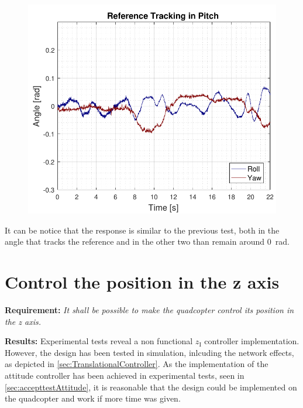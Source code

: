 \begin{minipage}{\linewidth}
\begin{minipage}{0.46\linewidth}
        \begin{figure}[H]
            \includegraphics[scale=.55]{figures/AccepttestRefTrackPitchRollYaw.pdf}
            \centering
            \label{fig:AccepttestRefTrackPitchRollYaw}
        \end{figure}
    \end{minipage}
\end{minipage}

It can be notice that the response is similar to the previous test, both in the angle that tracks the reference and in the other two than remain around \SI{0}{rad}.

\section{Control the position in the z axis}
\textbf{Requirement:}
\textit{It shall be possible to make the quadcopter control its position in the z axis.}

\textbf{Results:}
Experimental tests reveal a non functional $z_{\mathrm{I}}$ controller implementation. However, the design has been tested in simulation, inlcuding the network effects, as depicted in \autoref{sec:TranslationalController}. As the implementation of the attitude controller has been achieved in experimental tests, seen in \autoref{sec:accepttestAttitude}, it is reasonable that the design could be implemented on the quadcopter and work if more time was given.


